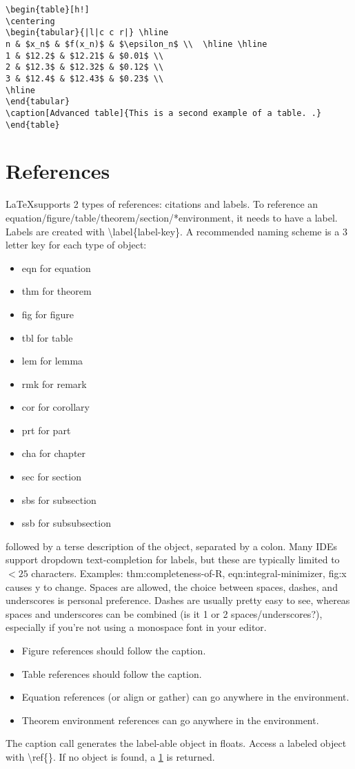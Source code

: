 \documentclass[11pt]{article}
\begin{document}
\begin{verbatim}
\begin{table}[h!]
\centering
\begin{tabular}{|l|c c r|} \hline
n & $x_n$ & $f(x_n)$ & $\epsilon_n$ \\  \hline \hline
1 & $12.2$ & $12.21$ & $0.01$ \\
2 & $12.3$ & $12.32$ & $0.12$ \\
3 & $12.4$ & $12.43$ & $0.23$ \\
\hline 
\end{tabular}
\caption[Advanced table]{This is a second example of a table. .}
\end{table}
\end{verbatim}
\section{References}
\LaTeX supports 2 types of references: citations and labels. To reference an equation/figure/table/theorem/section/*environment, it needs to have a label. Labels are created with \textbackslash label\{label-key\}. A recommended naming scheme is a 3 letter key for each type of object: 
\begin{itemize}
	\item eqn for equation
	\item thm for theorem
	\item fig for figure
	\item tbl for table
	\item lem for lemma
	\item rmk for remark
	\item cor for corollary
	\item prt for part
	\item cha for chapter
	\item sec for section
	\item sbs for subsection
	\item ssb for subsubsection
\end{itemize}
followed by a terse description of the object, separated by a colon. Many IDEs support dropdown text-completion for labels, but these are typically limited to $<25$ characters. Examples: thm:completeness-of-R, eqn:integral-minimizer, fig:x causes y to change. Spaces are allowed, the choice between spaces, dashes, and underscores is personal preference. Dashes are usually pretty easy to see, whereas spaces and underscores can be combined (is it 1 or 2 spaces/underscores?), especially if you're not using a monospace font in your editor.
\begin{itemize}
	\item Figure references should follow the caption. 
	\item Table references should follow the caption.
	\item Equation references (or align or gather) can go anywhere in the environment.
	\item Theorem environment references can go anywhere in the environment. 
\end{itemize}
The caption call generates the label-able object in floats. Access a labeled object with \textbackslash ref\{\}. If no object is found, a \ref{} is returned. 
\end{document}
